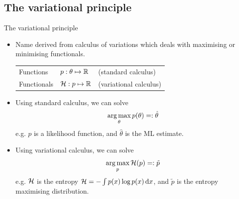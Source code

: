 \subsection{The variational principle}

\begin{frame}{The variational principle}
  \vspace{-10pt}
  \begin{itemize}[<+->]
    \item Name derived from calculus of variations which deals with maximising or minimising functionals.
    \begin{table}
      \begin{tabular}{l  l  l }
      Functions   &$p:\theta \mapsto \mathbb{R}$  &(standard calculus) \\ 
      Functionals &${\mathcal H}:p \mapsto \mathbb{R}$     &(variational calculus) \\ 
      \end{tabular}
    \end{table}
  \item Using standard calculus, we can solve
  \[
    \operatorname*{arg\,max}_\theta p(\theta) =: \hat\theta
  \]
  e.g. $p$ is a likelihood function, and $\hat\theta$ is the ML estimate.
  \item Using variational calculus, we can solve
  \[
    \operatorname*{arg\,max}_p {\mathcal H}(p) =: \tilde p
  \]
  e.g. ${\mathcal H}$ is the entropy ${\mathcal H} = - \int p(x)\log p(x) \, \text{d} x$, and $\tilde p$ is the entropy maximising distribution.
  \end{itemize}
  \vspace{5pt}
\end{frame}


